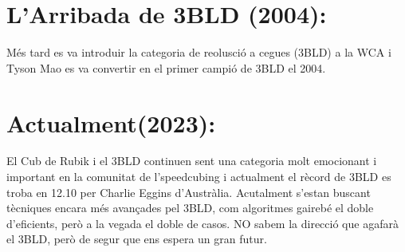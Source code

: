 \section{L'Arribada de 3BLD (2004):}

Més tard es va introduir la categoria de reolusció a cegues (3BLD) a la WCA i Tyson Mao es va convertir en el primer campió de 3BLD el 2004.

\section{Actualment(2023):}

El Cub de Rubik i el 3BLD continuen sent una categoria molt emocionant i important en la comunitat de l'speedcubing i actualment el rècord de 3BLD es troba en 12.10 per Charlie Eggins d'Austràlia. Acutalment s'estan buscant tècniques encara més avançades pel 3BLD, com algoritmes gairebé el doble d'eficients, però a la vegada el doble de casos. NO sabem la direcció que agafarà el 3BLD, però de segur que ens espera un gran futur. \cite{worldcubeassociation}




